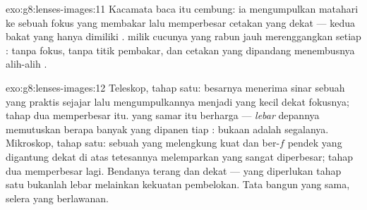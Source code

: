 \begin{solution}{exo:g8:lenses-images:11}
Kacamata baca itu cembung: ia mengumpulkan  matahari ke sebuah
fokus yang membakar lalu memperbesar cetakan yang dekat --- kedua
bakat yang hanya dimiliki .  milik cucunya
yang rabun jauh merenggangkan setiap : tanpa fokus, tanpa titik
pembakar, dan cetakan yang dipandang menembusnya  alih-alih
.
\end{solution}

\begin{solution}{exo:g8:lenses-images:12}
Teleskop, tahap satu:  besarnya menerima sinar sebuah 
yang praktis sejajar lalu mengumpulkannya menjadi  yang
kecil dekat fokusnya; tahap dua memperbesar  itu. 
 yang samar itu berharga --- \emph{lebar}  depannya
memutuskan berapa banyak yang dipanen tiap : bukaan adalah
segalanya. Mikroskop, tahap satu: sebuah  yang melengkung kuat
dan ber-$f$ pendek yang digantung dekat di atas tetesannya melemparkan
 yang sangat diperbesar; tahap dua memperbesar lagi.
Bendanya terang dan dekat --- yang diperlukan tahap satu bukanlah
lebar melainkan kekuatan pembelokan. Tata bangun yang sama, selera
yang berlawanan.
\end{solution}

